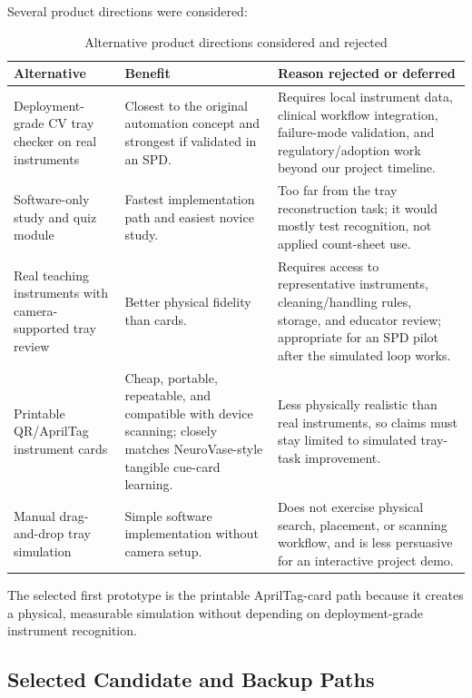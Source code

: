 \documentclass[10pt,a4paper]{article}
\begin{document}
Several product directions were considered:
\begin{table}[H]
\centering
\caption{Alternative product directions considered and rejected}
\label{tab:alternative-product-directions-considered-and-rejected}
\small\renewcommand{\arraystretch}{1.2}\setlength{\tabcolsep}{4pt}
\begin{tabularx}{\textwidth}{|>{\raggedright\arraybackslash}X|>{\raggedright\arraybackslash}X|>{\raggedright\arraybackslash}X|}
\hline
Alternative & Benefit & Reason rejected or deferred \\
\hline
Deployment-grade CV tray checker on real instruments & Closest to the original automation concept and strongest if validated in an SPD. & Requires local instrument data, clinical workflow integration, failure-mode validation, and regulatory/adoption work beyond our project timeline. \\
\hline
Software-only study and quiz module & Fastest implementation path and easiest novice study. & Too far from the tray reconstruction task; it would mostly test recognition, not applied count-sheet use. \\
\hline
Real teaching instruments with camera-supported tray review & Better physical fidelity than cards. & Requires access to representative instruments, cleaning/handling rules, storage, and educator review; appropriate for an SPD pilot after the simulated loop works. \\
\hline
Printable QR/AprilTag instrument cards & Cheap, portable, repeatable, and compatible with device scanning; closely matches NeuroVase-style tangible cue-card learning. & Less physically realistic than real instruments, so claims must stay limited to simulated tray-task improvement. \\
\hline
Manual drag-and-drop tray simulation & Simple software implementation without camera setup. & Does not exercise physical search, placement, or scanning workflow, and is less persuasive for an interactive project demo. \\
\hline
\end{tabularx}
\end{table}
The selected first prototype is the printable AprilTag-card path because it
creates a physical, measurable simulation without depending on deployment-grade
instrument recognition.
\subsection{Selected Candidate and Backup Paths}
\end{document}
